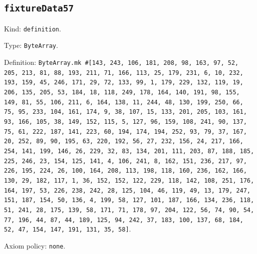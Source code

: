 \documentclass[11pt]{article}
\begin{document}
\subsection*{\texttt{fixtureData57}}
\noindent Kind: \texttt{definition}.\par
\noindent Type: \texttt{ByteArray}.\par
\noindent Definition: \texttt{ByteArray.mk \#[143, 243, 106, 181, 208, 98, 163, 97, 52, 205, 213, 81, 88, 193, 211, 71, 166, 113, 25, 179, 231, 6, 10, 232, 193, 159, 45, 246, 171, 29, 72, 133, 99, 1, 179, 229, 132, 119, 19, 206, 135, 205, 53, 184, 18, 118, 249, 178, 164, 140, 191, 98, 155, 149, 81, 55, 106, 211, 6, 164, 138, 11, 244, 48, 130, 199, 250, 66, 75, 95, 233, 104, 161, 174, 9, 38, 107, 15, 133, 201, 205, 103, 161, 93, 166, 105, 38, 149, 152, 115, 5, 127, 96, 159, 108, 241, 90, 137, 75, 61, 222, 187, 141, 223, 60, 194, 174, 194, 252, 93, 79, 37, 167, 20, 252, 89, 90, 195, 63, 220, 192, 56, 27, 232, 156, 24, 217, 166, 254, 141, 199, 146, 26, 229, 32, 83, 134, 201, 111, 203, 87, 188, 185, 225, 246, 23, 154, 125, 141, 4, 106, 241, 8, 162, 151, 236, 217, 97, 226, 195, 224, 26, 100, 164, 208, 113, 198, 118, 160, 236, 162, 166, 130, 29, 182, 117, 1, 36, 152, 152, 122, 229, 118, 142, 108, 251, 176, 164, 197, 53, 226, 238, 242, 28, 125, 104, 46, 119, 49, 13, 179, 247, 151, 187, 154, 50, 136, 4, 199, 58, 127, 101, 187, 166, 134, 236, 118, 51, 241, 28, 175, 139, 58, 171, 71, 178, 97, 204, 122, 56, 74, 90, 54, 77, 196, 44, 87, 44, 189, 125, 94, 242, 37, 183, 100, 137, 68, 184, 52, 47, 154, 147, 191, 131, 35, 58]}.\par
\noindent Axiom policy: \texttt{none}.\par
\end{document}
